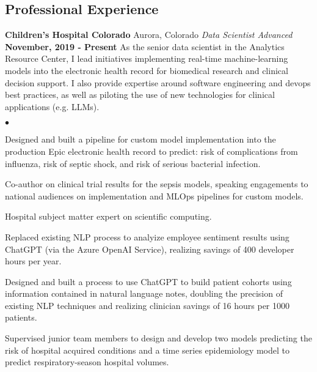 \documentclass[margin,line, 11pt]{res}
\newenvironment{list2}{
  \begin{list}{$\bullet$}{%
      \setlength{\itemsep}{0in}
      \setlength{\parsep}{0in} \setlength{\parskip}{0in}
      \setlength{\topsep}{0in} \setlength{\partopsep}{0in}
      \setlength{\leftmargin}{0.2in}}}{\end{list}}
\begin{document}
\begin{resume}
\section{Professional \newline Experience}
\textbf{Children's Hospital Colorado} \hfill Aurora, Colorado\newline
\textit{Data Scientist Advanced} \hfill \textbf{November, 2019 - Present}\newline
As the senior data scientist in the Analytics Resource Center, I lead initiatives implementing real-time machine-learning models into the electronic health record for biomedical research and clinical decision support. I also provide expertise around software engineering and devops best practices, as well as piloting the use of new technologies for clinical applications (e.g. LLMs).
    \begin{list2}
      \item Designed and built a pipeline for custom model implementation into the production Epic electronic health record to predict: risk of complications from influenza, risk of septic shock, and risk of serious bacterial infection.
      \item Co-author on clinical trial results for the sepsis models, speaking engagements to national audiences on implementation and MLOps pipelines for custom models.
      \item Hospital subject matter expert on scientific computing.
      \item Replaced existing NLP process to analyize employee sentiment results using ChatGPT (via the Azure OpenAI Service), realizing savings of 400 developer hours per year.
      \item Designed and built a process to use ChatGPT to build patient cohorts using information contained in natural language notes, doubling the precision of existing NLP techniques and realizing clinician savings of 16 hours per 1000 patients.
      \item Supervised junior team members to design and develop two models predicting the risk of hospital acquired conditions and a time series epidemiology model to predict respiratory-season hospital volumes.
    \end{list2}
\vspace*{-2mm}


\end{resume}
\end{document}
